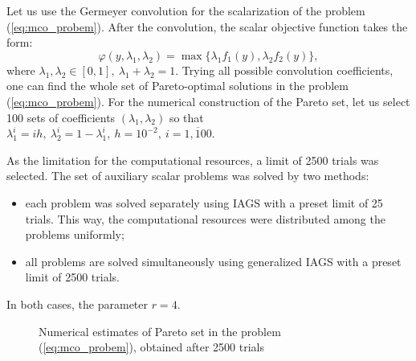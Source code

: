 \documentclass[runningheads]{llncs}
\begin{document}
Let us use the Germeyer convolution for the scalarization of the problem
(\ref{eq:mco_probem}).
After the convolution, the scalar objective function takes the form:
\begin{equation}
  \varphi(y,\lambda_1,\lambda_2)=\max\{\lambda_1 f_1(y), \lambda_2 f_2(y)\},
\end{equation}
where \(\lambda_1,\lambda_2\in[0,1],\: \lambda_1+\lambda_2=1\).
Trying all possible convolution coefficients, one can find the whole set of Pareto-optimal
solutions in the problem (\ref{eq:mco_probem}).
For the numerical construction of the Pareto set, let us select 100 sets of coefficients
\((\lambda_1,\lambda_2)\) so that
\(\lambda_1^i=i h,\: \lambda_2^i=1-\lambda_1^i,\: h=10^{-2},\: i=\overline{1, 100}\).

As the limitation for the computational resources, a limit of 2500 trials was selected.
The set of auxiliary scalar problems was solved by two methods:
\begin{itemize}
  \item each problem was solved separately using IAGS with a preset limit of 25 trials. This way,
the computational resources were distributed among the problems uniformly;
  \item all problems are solved simultaneously using generalized IAGS with a preset limit of
2500 trials.
\end{itemize}
In both cases, the parameter \(r=4\).

\begin{figure}[ht]
    \centering
    \caption{Numerical estimates of Pareto set in the problem (\ref{eq:mco_probem}), obtained
after 2500 trials}
    \label{fig:mco_pareto}
\end{figure}
\end{document}
